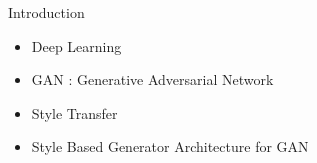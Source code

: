 
{
\begin{frame}[fragile]{Introduction}

    \begin{itemize}
      \item Deep Learning 
      \item GAN : Generative Adversarial Network
      \item Style Transfer
      \item Style Based Generator Architecture for GAN
    \end{itemize}

\end{frame}
}